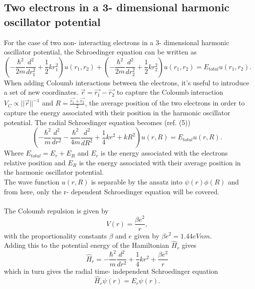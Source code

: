 \documentclass[10pt,a4paper]{article}
\begin{document}
\subsection{Two electrons in a 3- dimensional harmonic oscillator potential}
For the case of two non- interacting electrons in a 3- dimensional harmonic oscillator potential, the Schroedinger equation can be written as 
\begin{equation*}
\left(-\frac{\hbar^2}{2 m} \frac{d^2}{dr_1^2}+ \frac{1}{2}k r_1^2\right)u(r_1,r_2)+\left( -\frac{\hbar^2}{2 m} \frac{d^2}{dr_2^2}+ \frac{1}{2}k r_2^2\right)u(r_1,r_2)  = E_{total} u(r_1,r_2).
\end{equation*}
When adding Coloumb interactions between the electrons, it's useful to introduce a set of new coordinates. $\vec{r}=\vec{r_1}-\vec{r_2}$ to capture the Coloumb interaction $V_C \propto ||\vec{r}||^{-1}$ and $R = \frac{\vec{r_1}+\vec{r_2}}{2}$, the average position of the two electrons in order to capture the energy associated with their position in the harmonic oscillator potential. The radial Schroedinger equation becomes (ref. (5))
\begin{equation*}
\left(  -\frac{\hbar^2}{m} \frac{d^2}{dr^2} -\frac{\hbar^2}{4 m} \frac{d^2}{dR^2}+ \frac{1}{4} k r^2+  kR^2\right)u(r,R)  = E_{total} u(r,R).
\end{equation*}
Where $E_{total} = E_r+E_R$ and $E_r$ is the energy associated with the electrons relative position and $E_R$ is the energy associated with their average position in the harmonic oscillator potential.\\The wave function $u(r,R)$ is separable by the ansatz into $\psi(r)\phi(R)$ and from here, only the r- dependent Schroedinger equation will be covered.\\\\The Coloumb repulsion is given by
\begin{equation*}
V(r)=\frac{\beta e^2}{r},
\end{equation*}
with the proportionality constants $\beta$ and $e$ given by $\beta e^2 = 1.44 eVnm$.\\Adding this to the potential energy of the Hamiltonian $\hat{H}_r$ gives
\begin{equation*}
\hat{H}_r= -\frac{\hbar^2}{m} \frac{d^2}{dr^2}+ \frac{1}{4}k r^2+\frac{\beta e^2}{r}
\end{equation*}
which in turn gives the radial time- independent Schroedinger equation
\begin{equation*}
\hat{H}_r \psi(r)=E_r\psi(r).
\end{equation*}
\end{document}
